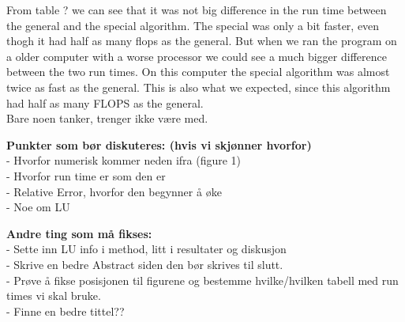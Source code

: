 \documentclass[a4paper,10pt]{article}
\begin{document}
From table ? we can see that it was not big difference in the run time between the general and the special algorithm. The special was only a bit faster, even thogh it had half as many flops as the general. But when we ran the program on a older computer with a worse processor we could see a much bigger difference between the two run times. On this computer the special algorithm was almost twice as fast as the general. This is also what we expected, since this algorithm had half as many FLOPS as the general. \\

Bare noen tanker, trenger ikke være med.

\bigskip

\textbf{Punkter som bør diskuteres: (hvis vi skjønner hvorfor)}\\
- Hvorfor numerisk kommer neden ifra (figure 1)\\
- Hvorfor run time er som den er\\
- Relative Error, hvorfor den begynner å øke\\
- Noe om LU
\bigskip

\textbf{Andre ting som må fikses:}\\
- Sette inn LU info i method, litt i resultater og diskusjon\\
- Skrive en bedre Abstract siden den bør skrives til slutt.\\
- Prøve å fikse posisjonen til figurene og bestemme hvilke/hvilken tabell med run times vi skal bruke.\\
- Finne en bedre tittel??
\end{document}
